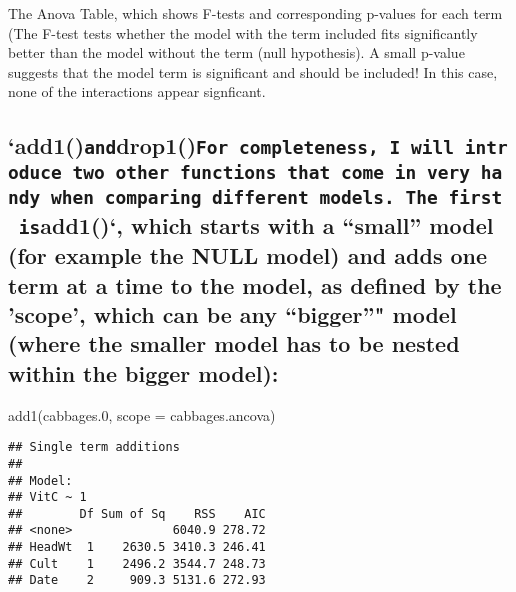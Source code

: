 \documentclass[
]{article}
\newenvironment{Shaded}{\begin{snugshade}}{\end{snugshade}}
\newcommand{\AttributeTok}[1]{\textcolor[rgb]{0.77,0.63,0.00}{#1}}
\newcommand{\FloatTok}[1]{\textcolor[rgb]{0.00,0.00,0.81}{#1}}
\newcommand{\FunctionTok}[1]{\textcolor[rgb]{0.00,0.00,0.00}{#1}}
\newcommand{\NormalTok}[1]{#1}
\begin{document}
The Anova Table, which shows F-tests and corresponding p-values for each
term (The F-test tests whether the model with the term included fits
significantly better than the model without the term (null hypothesis).
A small p-value suggests that the model term is significant and should
be included! In this case, none of the interactions appear signficant.

\hypertarget{add1anddrop1for-completeness-i-will-introduce-two-other-functions-that-come-in-very-handy-when-comparing-different-models.-the-first-isadd1-which-starts-with-a-small-model-for-example-the-null-model-and-adds-one-term-at-a-time-to-the-model-as-defined-by-the-scope-which-can-be-any-bigger-model-where-the-smaller-model-has-to-be-nested-within-the-bigger-model}{%
\subsection{\texorpdfstring{`add1()\texttt{and}drop1()\texttt{For\ completeness,\ I\ will\ introduce\ two\ other\ functions\ that\ come\ in\ very\ handy\ when\ comparing\ different\ models.\ The\ first\ is}add1()`,
which starts with a ``small'' model (for example the NULL model) and
adds one term at a time to the model, as defined by the 'scope', which
can be any ``bigger''" model (where the smaller model has to be nested
within the bigger
model):}{`add1()anddrop1()For completeness, I will introduce two other functions that come in very handy when comparing different models. The first isadd1()`, which starts with a ``small'' model (for example the NULL model) and adds one term at a time to the model, as defined by the 'scope', which can be any ``bigger''" model (where the smaller model has to be nested within the bigger model):}}\label{add1anddrop1for-completeness-i-will-introduce-two-other-functions-that-come-in-very-handy-when-comparing-different-models.-the-first-isadd1-which-starts-with-a-small-model-for-example-the-null-model-and-adds-one-term-at-a-time-to-the-model-as-defined-by-the-scope-which-can-be-any-bigger-model-where-the-smaller-model-has-to-be-nested-within-the-bigger-model}}

\begin{Shaded}
\begin{Highlighting}[]
\FunctionTok{add1}\NormalTok{(cabbages}\FloatTok{.0}\NormalTok{, }\AttributeTok{scope =}\NormalTok{ cabbages.ancova)}
\end{Highlighting}
\end{Shaded}

\begin{verbatim}
## Single term additions
## 
## Model:
## VitC ~ 1
##        Df Sum of Sq    RSS    AIC
## <none>              6040.9 278.72
## HeadWt  1    2630.5 3410.3 246.41
## Cult    1    2496.2 3544.7 248.73
## Date    2     909.3 5131.6 272.93
\end{verbatim}
\end{document}
